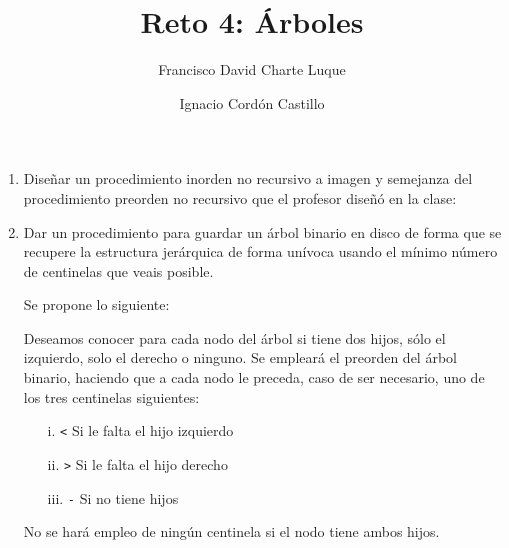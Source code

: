 \documentclass[a4paper,10pt]{scrartcl}
\title{Reto 4: Árboles}
\author{Francisco David Charte Luque\and
        Ignacio Cordón Castillo}
\date{}
\begin{document}
\maketitle
\begin{enumerate}

 \item Diseñar un procedimiento inorden no recursivo a imagen y semejanza
 del procedimiento preorden no recursivo que el profesor diseñó en la clase:
 
 \bigskip
 
 
 \item Dar un procedimiento para guardar un árbol binario en disco de forma
 que se recupere la estructura jerárquica de forma unívoca usando el mínimo
 número de centinelas que veais posible.
 
 Se propone lo siguiente:
 
 Deseamos conocer para cada nodo del árbol si tiene dos hijos, sólo el
 izquierdo, solo el derecho o ninguno. Se empleará el preorden del árbol
 binario, haciendo que a cada nodo le preceda, caso de ser necesario, uno
 de los tres centinelas siguientes:
  
 \begin{enumerate}
 \item[i.] \texttt{<} Si le falta el hijo izquierdo
 \item[ii.] \texttt{>} Si le falta el hijo derecho
 \item[iii.] \texttt{-} Si no tiene hijos
 \end{enumerate}
 
 No se hará empleo de ningún centinela si el nodo tiene ambos hijos.
   
 
\end{enumerate}
\end{document}
